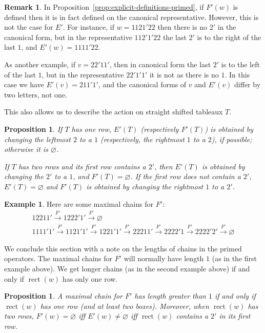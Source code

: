 \documentclass[10pt]{amsart}
\newtheorem{prop}[theorem]{Proposition}
\theoremstyle{definition}
\newtheorem{rema}[theorem]{Remark}
\newtheorem{exam}[theorem]{Example}
\DeclareMathOperator{\rectify}{rect}
\begin{document}
\begin{rema}
In Proposition~\ref{prop:explicit-definitions-primed}, if $F'(w)$ is defined then it is in fact defined on the canonical representative. However, this is not the case for $E'$. For instance, if $w=1121'22$ then there is no $2'$ in the canonical form, but in the representative $112'1'22$ the last $2'$ is to the right of the last $1$, and $E'(w)=1111'22$. 

As another example, if $v=22'11'$, then in canonical form the last $2'$ is to the left of the last $1$, but in the representative $22'1'1'$ it is not as there is no $1$. In this case we have $E'(v)=211'1'$, and the canonical forms of $v$ and $E'(v)$ differ by two letters, not one.
\end{rema}


This also allows us to describe the action on straight shifted tableaux $T$.

\begin{prop} \label{prop:rect-primed-action}
If $T$ has one row, $E'(T)$ \textup{(}respectively $F'(T)$\textup{)} is obtained by changing the leftmost $2$ to a $1$ \textup{(}respectively, the rightmost $1$ to a $2$\textup{)}, if possible; otherwise it is $\varnothing$.

If $T$ has two rows and its first row contains a $2'$, then $E'(T)$ is obtained by changing the $2'$ to a $1$, and $F'(T) = \varnothing$. If the first row does not contain a $2'$, $E'(T) = \varnothing$ and $F'(T)$ is obtained by changing the rightmost $1$ to a $2'$.
\end{prop}

\begin{exam} Here are some maximal chains for $F'$:
\begin{gather*}
12211' \xrightarrow{F'} 1222'1' \xrightarrow{F'} \varnothing
\\
1111'1' 
\xrightarrow{F'} 1121'1' 
\xrightarrow{F'} 1221'1' 
\xrightarrow{F'} 22211' 
\xrightarrow{F'} 2222'1
\xrightarrow{F'} 2222'2'
\xrightarrow{F'} \varnothing
\end{gather*}
\end{exam}


We conclude this section with a note on the lengths of chains in the primed operators. The maximal chains for $F'$ will normally have length $1$ (as in the first example above). We get longer chains (as in the second example above) if and only if $\rectify(w)$ has only one row. 

\begin{prop}\label{lem:maxchains}
A maximal chain for $F'$ has length greater than $1$ if and only if $\rectify(w)$ has one row \textup{(}and at least two boxes\textup{)}. Moreover, when $\rectify(w)$ has two rows, $F'(w) = \varnothing$ iff $E'(w) \neq \varnothing$ iff $\rectify(w)$ contains a $2'$ in its first row.
\end{prop}
\end{document}
